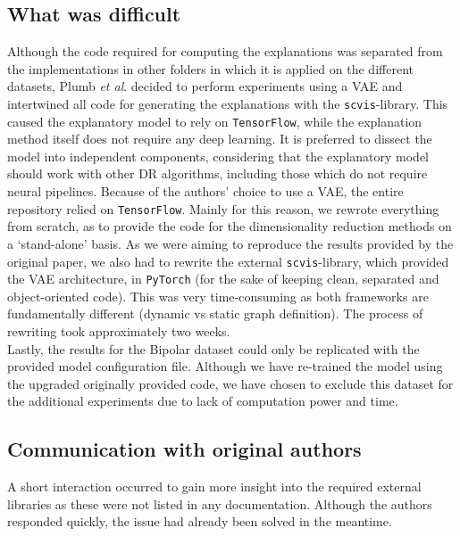 \subsection{What was difficult}
Although the code required for computing the explanations was separated from the implementations in other folders in which it is applied on the different datasets, Plumb \textit{et al}. decided to perform experiments using a VAE and intertwined all code for generating the explanations with the \texttt{scvis}-library. This caused the explanatory model to rely on \texttt{TensorFlow}, while the explanation method itself does not require any deep learning. It is preferred to dissect the model into independent components, considering that the explanatory model should work with other DR algorithms, including those which do not require neural pipelines. Because of the authors' choice to use a VAE, the entire repository relied on \texttt{TensorFlow}. Mainly for this reason, we rewrote everything from scratch, as to provide the code for the dimensionality reduction methods on a `stand-alone' basis. As we were aiming to reproduce the results provided by the original paper, we also had to rewrite the external \texttt{scvis}-library, which provided the VAE architecture, in \texttt{PyTorch} (for the sake of keeping clean, separated and object-oriented code). This was very time-consuming as both frameworks are fundamentally different (dynamic vs static graph definition). The process of rewriting took approximately two weeks.\\

Lastly, the results for the Bipolar dataset could only be replicated with the provided model configuration file. Although we have re-trained the model using the upgraded originally provided code, we have chosen to exclude this dataset for the additional experiments due to lack of computation power and time.

\subsection{Communication with original authors}
A short interaction occurred to gain more insight into the required external libraries as these were not listed in any documentation. Although the authors responded quickly, the issue had already been solved in the meantime.